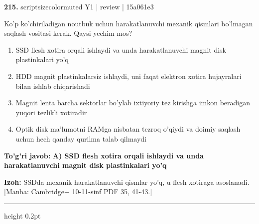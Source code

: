 \documentclass[10pt,a4paper]{article}
\begin{document}
{\bfseries\sffamily\color{ink} 215.} {scriptsizecolor{muted} Y1 | review | 15a061e3}
\par
Ko'p ko'chiriladigan noutbuk uchun harakatlanuvchi mexanik qismlari bo'lmagan saqlash vositasi kerak. Qaysi yechim mos?
\begin{enumerate}[label=\Alph*),leftmargin=9mm]
\item SSD flesh xotira orqali ishlaydi va unda harakatlanuvchi magnit disk plastinkalari yo'q
\item HDD magnit plastinkalarsiz ishlaydi, uni faqat elektron xotira hujayralari bilan ishlab chiqarishadi
\item Magnit lenta barcha sektorlar bo'ylab ixtiyoriy tez kirishga imkon beradigan yuqori tezlikli xotiradir
\item Optik disk ma'lumotni RAMga nisbatan tezroq o'qiydi va doimiy saqlash uchun hech qanday qurilma talab qilmaydi
\end{enumerate}
\begin{tcolorbox}[enhanced,breakable,colback=teal!4,colframe=teal!60!black,boxrule=0.45pt,arc=1.2mm,left=2.7mm,right=2.7mm,top=1.8mm,bottom=1.8mm,before skip=2mm,after skip=2mm]
{\bfseries\sffamily\color{teal}To'g'ri javob:} \textbf{A) SSD flesh xotira orqali ishlaydi va unda harakatlanuvchi magnit disk plastinkalari yo'q}
\par\smallskip
{\bfseries Izoh:} SSDda mexanik harakatlanuvchi qismlar yo'q, u flesh xotiraga asoslanadi. [Manba: Cambridge+ 10-11-sinf PDF 35, 41-43.]
\end{tcolorbox}
\vspace{2mm}\hrule height 0.2pt\vspace{3mm}
\end{document}
